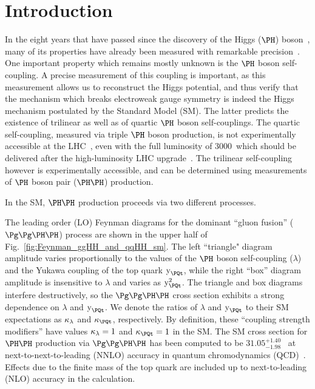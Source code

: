 \section{Introduction}
\label{sec:introduction}

In the eight years that have passed since the discovery of the Higgs ($\PHiggs$) boson~\cite{Higgs-Discovery_CMS,Higgs-Discovery_CMS_long,Higgs-Discovery_ATLAS},
many of its properties have already been measured with remarkable precision~\cite{HIG-14-042,HIG-15-002,ATLAS_SpinCP,HIG-14-018,HIG-16-041}. %
One important property which remains mostly unknown is the $\PHiggs$ boson self-coupling.
A precise measurement of this coupling is important, as this measurement allows us to reconstruct the Higgs potential,
and thus verify that the mechanism which breaks electroweak gauge symmetry is indeed the Higgs mechanism postulated by the Standard Model (SM).
The latter predicts the existence of trilinear as well as of quartic $\PHiggs$ boson self-couplings.
The quartic self-coupling, measured via triple $\PHiggs$ boson production, is not experimentally accessible at the LHC~\cite{de_Florian_2020},
even with the full luminosity of 3000~\fbinv which should be delivered after the high-luminosity LHC upgrade~\cite{HL-LHC-TDR}.
The trilinear self-coupling however is experimentally accessible, and can be determined using measurements of $\PHiggs$ boson pair ($\HH$) production.

In the SM, $\HH$ production proceeds via two different processes.

The leading order (LO) Feynman diagrams for the dominant ``gluon fusion'' ($\ggHH$) process are shown in the upper half of Fig.~\ref{fig:Feynman_ggHH_and_qqHH_sm}.
The left ``triangle" diagram amplitude varies proportionally to the values of the $\PHiggs$ boson self-coupling ($\lambda$)
and the Yukawa coupling of the top quark $\yt$,
while the right ``box'' diagram amplitude is insensitive to $\lambda$ and varies as $\yt^{2}$.
The triangle and box diagrams interfere destructively, 
so the $\ggHH$ cross section exhibits a strong dependence on $\lambda$ and $\yt$.
We denote the ratios of $\lambda$ and $\yt$ to their SM expectations as $\kappa_{\lambda}$ and $\kappat$, respectively.
By definition, these ``coupling strength modifiers'' have values $\kappa_{\lambda} = 1$ and $\kappat = 1$ in the SM.
The SM cross section for $\HH$ production via $\ggHH$ has been computed to be $31.05^{+1.40}_{-1.98}$~\fb
at next-to-next-to-leading (NNLO) accuracy in quantum chromodynamics (QCD)~\cite{Grazzini:2018hh}.
Effects due to the finite mass of the top quark are included up to next-to-leading (NLO) accuracy in the calculation.

